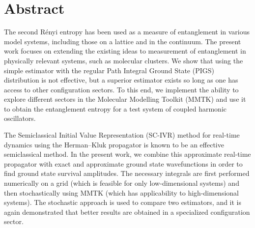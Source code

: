 \chapter*{Abstract}

The second Rényi entropy has been used as a measure of entanglement in various model systems, including those on a lattice and in the continuum.
The present work focuses on extending the existing ideas to measurement of entanglement in physically relevant systems, such as molecular clusters.
We show that using the simple estimator with the regular Path Integral Ground State (PIGS) distribution is not effective, but a superior estimator exists so long as one has access to other configuration sectors.
To this end, we implement the ability to explore different sectors in the Molecular Modelling Toolkit (MMTK) and use it to obtain the entanglement entropy for a test system of coupled harmonic oscillators.

The Semiclassical Initial Value Representation (SC-IVR) method for real-time dynamics using the Herman--Kluk propagator is known to be an effective semiclassical method.
In the present work, we combine this approximate real-time propagator with exact and approximate ground state wavefunctions in order to find ground state survival amplitudes.
The necessary integrals are first performed numerically on a grid (which is feasible for only low-dimensional systems) and then stochastically using MMTK (which has applicability to high-dimensional systems).
The stochastic approach is used to compare two estimators, and it is again demonstrated that better results are obtained in a specialized configuration sector.
